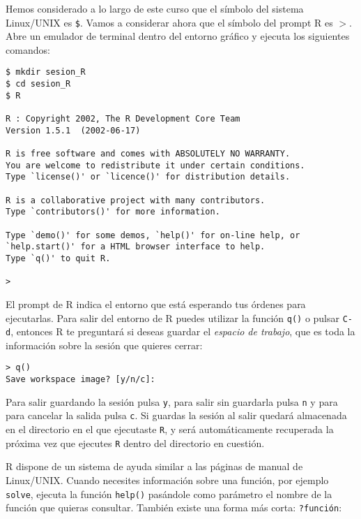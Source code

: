 Hemos considerado a lo largo de  este curso que el símbolo del sistema
Linux/UNIX es  {\tt \$}. Vamos a  considerar ahora que el  símbolo del
prompt  {\sf R}  es {\tt  $>$}.   Abre un  emulador de
terminal dentro del entorno gráfico y ejecuta los siguientes comandos:

\begin{verbatim}
$ mkdir sesion_R
$ cd sesion_R
$ R

R : Copyright 2002, The R Development Core Team
Version 1.5.1  (2002-06-17)

R is free software and comes with ABSOLUTELY NO WARRANTY.
You are welcome to redistribute it under certain conditions.
Type `license()' or `licence()' for distribution details.

R is a collaborative project with many contributors.
Type `contributors()' for more information.

Type `demo()' for some demos, `help()' for on-line help, or
`help.start()' for a HTML browser interface to help.
Type `q()' to quit R.

> 
\end{verbatim}

El prompt de {\sf R} indica  el entorno que está esperando tus órdenes
para ejecutarlas. Para salir del entorno de {\sf R} puedes utilizar la
función {\tt q()}  o pulsar {\tt C-d}, entonces {\sf  R} te preguntará
si  deseas  guardar el  {\em  espacio  de  trabajo},  que es  toda  la
información sobre la sesión que quieres cerrar:


\begin{verbatim}
> q()
Save workspace image? [y/n/c]: 
\end{verbatim}

Para salir guardando la sesión pulsa {\tt y}, para salir sin guardarla
pulsa {\tt n} y para para cancelar la salida pulsa {\tt c}. Si guardas
la  sesión al  salir quedará  almacenada en  el directorio  en el  que
ejecutaste {\tt R},  y será automáticamente recuperada  la próxima vez
que ejecutes {\tt R} dentro del directorio en cuestión.

{\sf R} dispone de un sistema de ayuda similar a las páginas de manual
de  Linux/UNIX. Cuando  necesites información  sobre una  función, por
ejemplo {\tt  solve}, ejecuta la  función {\tt help()}  pasándole como
parámetro el nombre de la función que quieras consultar. También existe
una forma más corta: {\tt ?función}:


